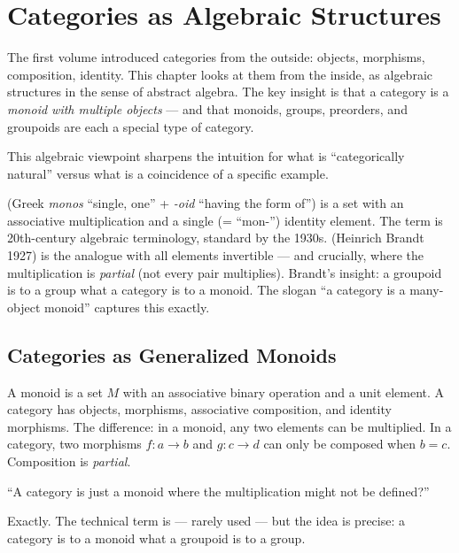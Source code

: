 
\chapter{Categories as Algebraic Structures}

The first volume introduced categories from the outside: objects, morphisms,
composition, identity. This chapter looks at them from the inside, as algebraic
structures in the sense of abstract algebra. The key insight is that a category
is a \emph{monoid with multiple objects} — and that monoids, groups, preorders,
and groupoids are each a special type of category.

This algebraic viewpoint sharpens the intuition for what is ``categorically
natural'' versus what is a coincidence of a specific example.

\begin{nameorigin}
 (Greek \emph{monos} ``single, one'' + \emph{-oid}
``having the form of'') is a set with an associative multiplication and
a single (= ``mon-'') identity element. The term is 20th-century
algebraic terminology, standard by the 1930s.  (Heinrich
Brandt 1927) is the analogue with all elements invertible — and crucially,
where the multiplication is \emph{partial} (not every pair multiplies).
Brandt's insight: a groupoid is to a group what a category is to a
monoid. The slogan ``a category is a many-object monoid'' captures this
exactly.
\end{nameorigin}

\section{Categories as Generalized Monoids}

A monoid is a set $M$ with an associative binary operation and a unit element.
A category has objects, morphisms, associative composition, and identity morphisms.
The difference: in a monoid, any two elements can be multiplied. In a category,
two morphisms $f : a \to b$ and $g : c \to d$ can only be composed when $b = c$.
Composition is \emph{partial}.

\begin{dialog}
``A category is just a monoid where the multiplication might not be defined?''

Exactly. The technical term is  — rarely used — but the idea is
precise: a category is to a monoid what a groupoid is to a group.
\end{dialog}

